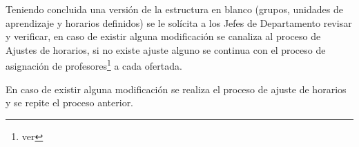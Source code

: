\begin{PDescripcion}
\begin{enumerate}
		
		
		
		
		\Ppaso[\PSubProceso]  Teniendo concluida una versión de la estructura en blanco (grupos, unidades de aprendizaje y horarios definidos) se le solícita a los Jefes de Departamento revisar y verificar,  en caso de existir alguna modificación se canaliza al proceso de Ajustes de horarios, si no existe ajuste alguno se continua con el proceso de asignación de profesores\footnote{ver } a cada  ofertada.
		
		
		
		

		\Ppaso[\PSubProceso]  En caso de existir alguna modificación se realiza el proceso de ajuste de horarios y se repite el proceso anterior.
		
		
	\end{enumerate}
\end{PDescripcion}